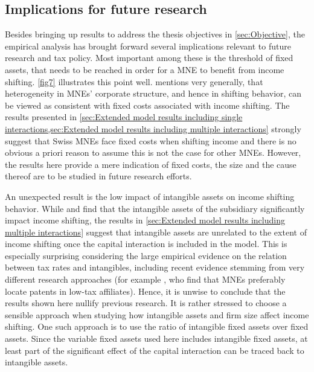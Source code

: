 \documentclass[10pt,twocolumn,oneside,cmyk]{article}
\begin{document}
\subsection{Implications for future research} \label{sec:Implications for future research}
Besides bringing up results to address the thesis objectives in \cref{sec:Objective}, the empirical analysis has brought forward several implications relevant to future research and tax policy. Most important among these is the threshold of fixed assets, that needs to be reached in order for a MNE to benefit from income shifting. \cref{fig7} illustrates this point well. \textcite[445]{dharmapala_what_2014} mentions very generally, that heterogeneity in MNEs' corporate structure, and hence in shifting behavior, can be viewed as consistent with fixed costs associated with income shifting. The results presented in \cref{sec:Extended model results including single interactions,sec:Extended model results including multiple interactions} strongly suggest that Swiss MNEs face fixed costs when shifting income and there is no obvious a priori reason to assume this is not the case for other MNEs. However, the results here provide a mere indication of fixed costs, the size and the cause thereof are to be studied in future research efforts.

An unexpected result is the low impact of intangible assets on income shifting behavior. While \textcite[435]{beer_profit_2015} and \textcite[706]{dischinger_corporate_2011} find that the intangible assets of the subsidiary significantly impact income shifting, the results in \cref{sec:Extended model results including multiple interactions} suggest that intangible assets are unrelated to the extent of income shifting once the capital interaction is included in the model. This is especially surprising considering the large empirical evidence on the relation between tax rates and intangibles, including recent evidence stemming from very different research approaches (for example \textcite[185]{karkinsky_corporate_2012}, who find that MNEs preferably locate patents in low-tax affiliates). Hence, it is unwise to conclude that the results shown here nullify previous research. It is rather stressed to choose a sensible approach when studying how intangible assets and firm size affect income shifting. One such approach is to use the ratio of intangible fixed assets over fixed assets. Since the variable fixed assets used here includes intangible fixed assets, at least part of the significant effect of the capital interaction can be traced back to intangible assets.
\end{document}
